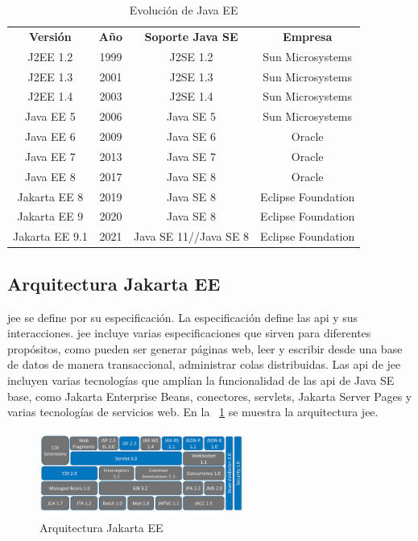 \begin{table}
  \centering
  \begin{tabular}{c|c|c|c}
  \rowcolor{udcpink!25}
  \textbf{Versión} & \textbf{Año} & \textbf{Soporte Java SE} & \textbf{Empresa}\\
J2EE 1.2 & 1999 & J2SE 1.2 & Sun Microsystems \\
J2EE 1.3 & 2001 & J2SE 1.3 & Sun Microsystems \\
J2EE 1.4 &2003 & J2SE 1.4 & Sun Microsystems \\
Java EE 5 & 2006 & Java SE 5 & Sun Microsystems \\
Java EE 6 & 2009 & Java SE 6 & Oracle \\
Java EE 7 & 2013 & Java SE 7 & Oracle \\
Java EE 8 & 2017 & Java SE 8 & Oracle \\
Jakarta EE 8 & 2019 & Java SE 8 & Eclipse Foundation \\
Jakarta EE 9 & 2020 & Java SE 8 & Eclipse Foundation \\
Jakarta EE 9.1 & 2021 & Java SE 11//Java SE 8 & Eclipse Foundation \\
  \end{tabular}
  \caption{Evolución de Java EE}
  \label{tab:evolucionJavaEE}
\end{table}



\subsection{Arquitectura Jakarta EE}
\label{sec:arquitectura}


\acrshort{jee} se define por su especificación. La especificación define las \acrfull{api} y sus interacciones. \acrshort{jee} incluye varias especificaciones que sirven para diferentes propósitos, como pueden ser generar páginas web, leer y escribir desde una base de datos de manera transaccional, administrar colas distribuidas. Las \acrshort{api} de \acrshort{jee} incluyen varias tecnologías que amplían la funcionalidad de las \acrshort{api} de Java SE base, como Jakarta Enterprise Beans, conectores, servlets, Jakarta Server Pages y varias tecnologías de servicios web. En la \figurename~\ref{fig:arquitecturaJakartaEE} se muestra la arquitectura \acrshort{jee}.


\begin{figure}[hp!]
  \centering
  \includegraphics[width=0.6\textwidth]{imaxes/JakartaEE-Architecture.png}
  \caption{Arquitectura Jakarta EE}
  \label{fig:arquitecturaJakartaEE}
\end{figure}

